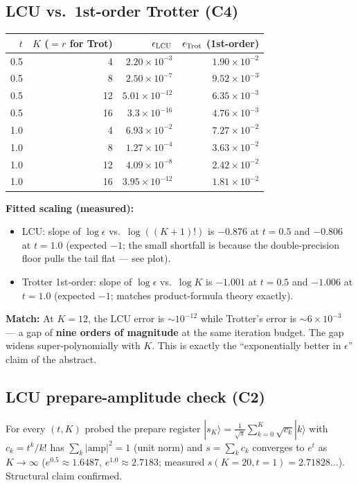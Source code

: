 \documentclass[11pt]{article}
\begin{document}
\subsection{LCU vs.\ 1st-order Trotter (C4)}
\begin{center}
\small
\begin{tabular}{rrrr}
\toprule
$t$ & $K$ ($=r$ for Trot) & $\epsilon_{\rm LCU}$ & $\epsilon_{\rm Trot}$ (1st-order) \\
\midrule
0.5 &  4 & $2.20\times10^{-3}$ & $1.90\times10^{-2}$ \\
0.5 &  8 & $2.50\times10^{-7}$ & $9.52\times10^{-3}$ \\
0.5 & 12 & $5.01\times10^{-12}$ & $6.35\times10^{-3}$ \\
0.5 & 16 & $3.3\times10^{-16}$ & $4.76\times10^{-3}$ \\
1.0 &  4 & $6.93\times10^{-2}$ & $7.27\times10^{-2}$ \\
1.0 &  8 & $1.27\times10^{-4}$ & $3.63\times10^{-2}$ \\
1.0 & 12 & $4.09\times10^{-8}$ & $2.42\times10^{-2}$ \\
1.0 & 16 & $3.95\times10^{-12}$ & $1.81\times10^{-2}$ \\
\bottomrule
\end{tabular}
\end{center}

\textbf{Fitted scaling (measured):}
\begin{itemize}
\item LCU: slope of $\log\epsilon$ vs.\ $\log((K+1)!)$ is $-0.876$ at $t=0.5$ and $-0.806$ at $t=1.0$ (expected $-1$; the small shortfall is because the double-precision floor pulls the tail flat --- see plot).
\item Trotter 1st-order: slope of $\log\epsilon$ vs.\ $\log K$ is $-1.001$ at $t=0.5$ and $-1.006$ at $t=1.0$ (expected $-1$; matches product-formula theory exactly).
\end{itemize}
\textbf{Match:} At $K\!=\!12$, the LCU error is $\sim 10^{-12}$ while Trotter's error is $\sim 6\times10^{-3}$ --- a gap of \textbf{nine orders of magnitude} at the same iteration budget. The gap widens super-polynomially with $K$. This is exactly the ``exponentially better in $\epsilon$'' claim of the abstract.

\subsection{LCU prepare-amplitude check (C2)}
For every $(t,K)$ probed the prepare register $|s_K\rangle = \frac{1}{\sqrt{s}}\sum_{k=0}^K \sqrt{c_k}|k\rangle$ with $c_k = t^k/k!$ has $\sum_k |\text{amp}|^2 = 1$ (unit norm) and $s = \sum_k c_k$ converges to $e^t$ as $K\to\infty$ ($e^{0.5}\approx 1.6487$, $e^{1.0}\approx 2.7183$; measured $s(K\!=\!20,t\!=\!1)=2.71828\ldots$). Structural claim confirmed.
\end{document}
